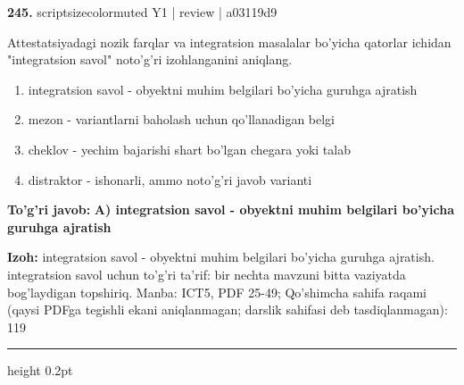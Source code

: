 \documentclass[10pt,a4paper]{article}
\begin{document}
{\bfseries\sffamily\color{ink} 245.} {scriptsizecolor{muted} Y1 | review | a03119d9}
\par
Attestatsiyadagi nozik farqlar va integratsion masalalar bo'yicha qatorlar ichidan "integratsion savol" noto'g'ri izohlanganini aniqlang.
\begin{enumerate}[label=\Alph*),leftmargin=9mm]
\item integratsion savol - obyektni muhim belgilari bo'yicha guruhga ajratish
\item mezon - variantlarni baholash uchun qo'llanadigan belgi
\item cheklov - yechim bajarishi shart bo'lgan chegara yoki talab
\item distraktor - ishonarli, ammo noto'g'ri javob varianti
\end{enumerate}
\begin{tcolorbox}[enhanced,breakable,colback=teal!4,colframe=teal!60!black,boxrule=0.45pt,arc=1.2mm,left=2.7mm,right=2.7mm,top=1.8mm,bottom=1.8mm,before skip=2mm,after skip=2mm]
{\bfseries\sffamily\color{teal}To'g'ri javob:} \textbf{A) integratsion savol - obyektni muhim belgilari bo'yicha guruhga ajratish}
\par\smallskip
{\bfseries Izoh:} integratsion savol - obyektni muhim belgilari bo'yicha guruhga ajratish. integratsion savol uchun to'g'ri ta'rif: bir nechta mavzuni bitta vaziyatda bog'laydigan topshiriq. Manba: ICT5, PDF 25-49; Qo'shimcha sahifa raqami (qaysi PDFga tegishli ekani aniqlanmagan; darslik sahifasi deb tasdiqlanmagan): 119
\end{tcolorbox}
\vspace{2mm}\hrule height 0.2pt\vspace{3mm}
\end{document}
